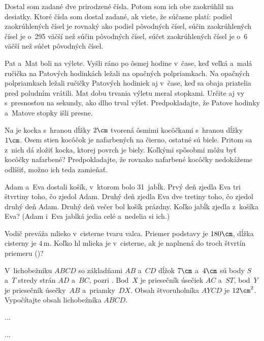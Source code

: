 {%
Dostal som zadané dve prirodzené čísla. Potom som ich obe zaokrúhlil na desiatky. Ktoré čísla som dostal zadané, ak viete, že súčasne platí:
\itemitem{$\bullet$} podiel zaokrúhlených čísel je rovnaký ako podiel pôvodných čísel,
\itemitem{$\bullet$} súčin zaokrúhlených čísel je o~295 väčší než súčin pôvodných čísel,
\itemitem{$\bullet$} súčet zaokrúhlených čísel je o~6 väčší než súčet pôvodných čísel.
}

{%
Pat a~Mat boli na výlete. Vyšli ráno po ôsmej hodine v~čase, keď veľká a~malá ručička na Patových hodinkách ležali na opačných polpriamkach. Na opačných polpriamkach ležali ručičky Patových hodiniek aj v~čase, keď sa obaja priatelia pred poludním vrátili. Mat dobu trvania výletu meral stopkami. Určite aj vy s~presnosťou na sekundy, ako dlho trval výlet. Predpokladajte, že Patove hodinky a~Matove stopky išli presne.}

{%
Na \obr{} je kocka s~hranou dĺžky $2\cm$ tvorená ôsmimi kocôčkami s~hranou dĺžky $1\cm$. Osem stien kocôčok je nafarbených na čierno, ostatné sú biele. Pritom sa z~nich dá zložiť kocka, ktorej povrch je biely. Koľkými spôsobmi môžu byť kocôčky nafarbené? Predpokladajte, že rovnako nafarbené kocôčky nedokážeme odlíšiť, možno ich teda zamieňať.
%
}

{%
Adam a~Eva dostali košík, v~ktorom bolo 31~jabĺk. Prvý deň zjedla Eva tri štvrtiny toho, čo zjedol Adam. Druhý deň zjedla Eva dve tretiny toho, čo zjedol druhý deň Adam. Druhý deň večer bol košík prázdny. Koľko jabĺk zjedla z~košíka Eva? (Adam i~Eva jablká jedia celé a~nedelia si ich.)}

{%
Vodič preváža mlieko v~cisterne tvaru valca. Priemer podstavy je $180\cm$, dĺžka cisterny je $4\,\text{m}$. Koľko hl mlieka je v~cisterne, ak je naplnená do troch štvrtín priemeru (\obr{})?
%
}

{%
V~lichobežníku $ABCD$ so základňami $AB$ a~$CD$ dĺžok $7\cm$ a~$4\cm$ sú body $S$ a~$T$ stredy strán $AD$ a~$BC$, pozri \obr{}. Bod~$X$ je priesečník úsečiek $AC$ a~$ST$, bod~$Y$ je priesečník úsečky~$AB$ a~priamky~$DX$. Obsah štvoruholníka $AYCD$ je $12\cm^2$. Vypočítajte obsah lichobežníka $ABCD$.
%
}

{%
...}

{%
...}

